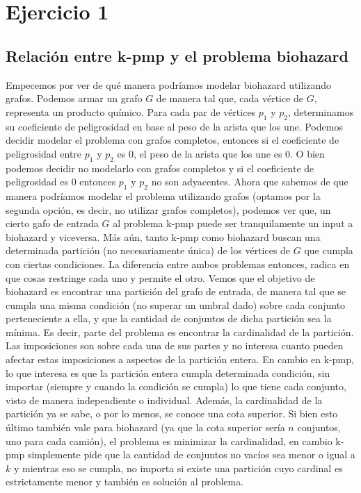 \documentclass[a4paper]{article}
\begin{document}
\section{Ejercicio 1}
\subsection{Relación entre k-pmp y el problema biohazard}
Empecemos por ver de qué manera podríamos modelar biohazard utilizando grafos. Podemos armar un grafo $G$ de manera tal que, cada vértice de $G$, representa un producto químico. Para cada par de vértices $p_1$ y $p_2$, determinamos su coeficiente de peligrosidad en base al peso de la arista que los une. Podemos decidir modelar el problema con grafos completos, entonces si el coeficiente de peligrosidad entre $p_1$ y $p_2$ es 0, el peso de la arista que los une es 0. O bien podemos decidir no modelarlo con grafos completos y si el coeficiente de peligrosidad es 0 entonces $p_1$ y $p_2$ no son adyacentes.
\newline Ahora que sabemos de que manera podríamos modelar el problema utilizando grafos (optamos por la segunda opción, es decir, no utilizar grafos completos), podemos ver que, un cierto gafo de entrada $G$ al problema k-pmp puede ser tranquilamente un input a biohazard y viceversa. Más aún, tanto k-pmp como biohazard buscan una determinada partición (no necesariamente única) de los vértices de $G$ que cumpla con ciertas condiciones. La diferencia entre ambos problemas entonces, radica en que cosas restringe cada uno y permite el otro.
\newline Vemos que el objetivo de biohazard es encontrar una partición del grafo de entrada, de manera tal que se cumpla una misma condición (no superar un umbral dado) sobre cada conjunto perteneciente a ella, y que la cantidad de conjuntos de dicha partición sea la mínima. Es decir, parte del problema es encontrar la cardinalidad de la partición. Las imposiciones son sobre cada una de sus partes y no interesa cuanto pueden afectar estas imposiciones a aspectos de la partición entera. En cambio en k-pmp, lo que interesa es que la partición entera cumpla determinada condición, sin importar (siempre y cuando la condición se cumpla) lo que tiene cada conjunto, visto de manera independiente o individual. Además, la cardinalidad de la partición ya se sabe, o por lo menos, se conoce una cota superior. Si bien esto último también vale para biohazard (ya que la cota superior sería $n$ conjuntos, uno para cada camión), el problema es minimizar la cardinalidad, en cambio k-pmp simplemente pide que la cantidad de conjuntos no vacíos sea menor o igual a $k$ y mientras eso se cumpla, no importa si existe una partición cuyo cardinal es estrictamente menor y también es solución al problema.
\end{document}
